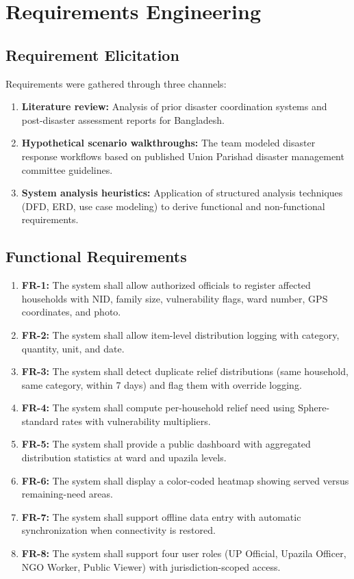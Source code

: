 \section{Requirements Engineering}

\subsection{Requirement Elicitation}
Requirements were gathered through three channels:
\begin{enumerate}
    \item \textbf{Literature review:} Analysis of prior disaster coordination systems and post-disaster assessment reports for Bangladesh.
    \item \textbf{Hypothetical scenario walkthroughs:} The team modeled disaster response workflows based on published Union Parishad disaster management committee guidelines.
    \item \textbf{System analysis heuristics:} Application of structured analysis techniques (DFD, ERD, use case modeling) to derive functional and non-functional requirements.
\end{enumerate}

\subsection{Functional Requirements}
\begin{enumerate}
    \item \textbf{FR-1:} The system shall allow authorized officials to register affected households with NID, family size, vulnerability flags, ward number, GPS coordinates, and photo.
    \item \textbf{FR-2:} The system shall allow item-level distribution logging with category, quantity, unit, and date.
    \item \textbf{FR-3:} The system shall detect duplicate relief distributions (same household, same category, within 7 days) and flag them with override logging.
    \item \textbf{FR-4:} The system shall compute per-household relief need using Sphere-standard rates with vulnerability multipliers.
    \item \textbf{FR-5:} The system shall provide a public dashboard with aggregated distribution statistics at ward and upazila levels.
    \item \textbf{FR-6:} The system shall display a color-coded heatmap showing served versus remaining-need areas.
    \item \textbf{FR-7:} The system shall support offline data entry with automatic synchronization when connectivity is restored.
    \item \textbf{FR-8:} The system shall support four user roles (UP Official, Upazila Officer, NGO Worker, Public Viewer) with jurisdiction-scoped access.
\end{enumerate}


